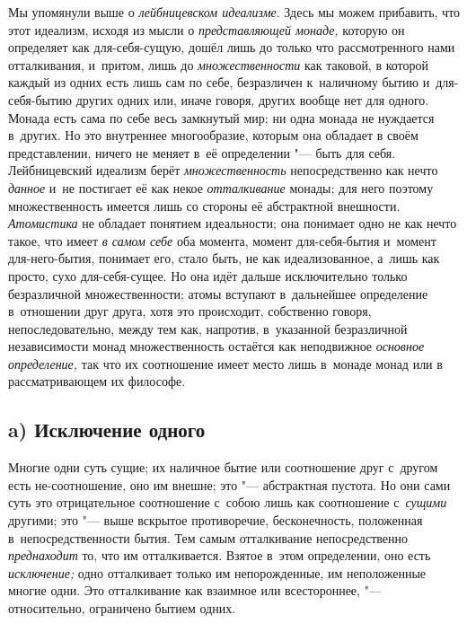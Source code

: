 
Мы упомянули выше о {\em лейбницевском идеализме}. Здесь
мы можем прибавить, что этот идеализм, исходя из мысли о
{\em представляющей монаде,} которую он определяет как
для-себя-сущую, дошёл лишь до только что рассмотренного нами отталкивания,
и~притом, лишь до {\em множественности} как таковой, в
которой каждый из одних есть лишь сам по себе, безразличен к~наличному
бытию и~для-себя-бытию других одних или, иначе говоря, других вообще нет
для одного. Монада есть сама по себе весь замкнутый мир; ни одна монада не
нуждается в~других. Но это внутреннее многообразие, которым она обладает в
своём представлении, ничего не меняет в~её определении "--- быть для себя.
Лейбницевский идеализм берёт {\em множественность}
непосредственно как нечто {\em данное} и~не постигает
её как некое {\em отталкивание} монады; для него
поэтому множественность имеется лишь со стороны её абстрактной внешности.
{\em Атомистика} не обладает понятием идеальности; она
понимает одно не как нечто такое, что имеет {\em в
самом себе} оба момента, момент для-себя-бытия и~момент для-него-бытия,
понимает его, стало быть, не как идеализованное, а~лишь как просто, сухо
для-себя-сущее. Но она идёт дальше исключительно только безразличной
множественности; атомы вступают в~дальнейшее определение в~отношении друг
друга, хотя это происходит, собственно говоря, непоследовательно, между тем
как, напротив, в~указанной безразличной независимости монад множественность
остаётся как неподвижное {\em основное определение,}
так что их соотношение имеет место лишь в~монаде монад или в
рассматривающем их философе.

\bigskip


\subsection[a) Исключение одного]{a) Исключение одного}

Многие одни суть сущие; их наличное бытие или соотношение друг с~другом есть
не-соотношение, оно им внешне; это "--- абстрактная пустота. Но они сами суть
это отрицательное соотношение с~собою лишь как соотношение с~{\em сущими}
другими; это "--- выше вскрытое противоречие, бесконечность, положенная
в~непосредственности бытия. Тем самым отталкивание непосредственно {\em
преднаходит} то, что им отталкивается. Взятое в~этом определении, оно есть
{\em исключение;} одно отталкивает только им непорожденные, им неположенные
многие одни. Это отталкивание как взаимное или всестороннее, "--- относительно,
ограничено бытием одних.

